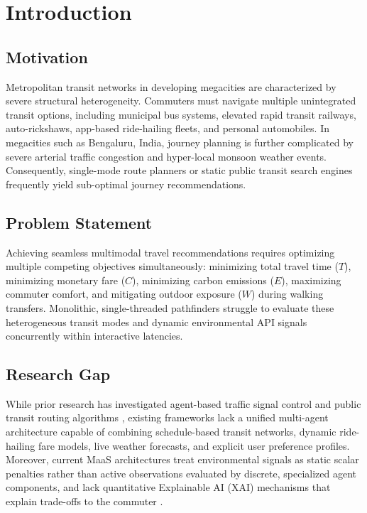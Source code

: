 \documentclass[runningheads]{llncs}
\begin{document}
\begin{abstract}
to $C=50$. Component ablation demonstrates that disabling multi-agent candidate coordination ($A_4$) causes a $39.2\%$ relative reduction in utility score ($82.3 \rightarrow 50.0$), indicating the importance of coordinated candidate aggregation in the evaluated scenario.

\end{abstract}


\section{Introduction}
\label{sec:intro}

\subsection{Motivation}
Metropolitan transit networks in developing megacities are characterized by severe structural heterogeneity. Commuters must navigate multiple unintegrated transit options, including municipal bus systems, elevated rapid transit railways, auto-rickshaws, app-based ride-hailing fleets, and personal automobiles. In megacities such as Bengaluru, India, journey planning is further complicated by severe arterial traffic congestion and hyper-local monsoon weather events. Consequently, single-mode route planners or static public transit search engines frequently yield sub-optimal journey recommendations.

\subsection{Problem Statement}
Achieving seamless multimodal travel recommendations requires optimizing multiple competing objectives simultaneously: minimizing total travel time ($T$), minimizing monetary fare ($C$), minimizing carbon emissions ($E$), maximizing commuter comfort, and mitigating outdoor exposure ($W$) during walking transfers. Monolithic, single-threaded pathfinders struggle to evaluate these heterogeneous transit modes and dynamic environmental API signals concurrently within interactive latencies.

\subsection{Research Gap}
While prior research has investigated agent-based traffic signal control \cite{chen2021multi} and public transit routing algorithms \cite{delling2015round, bast2016route}, existing frameworks lack a unified multi-agent architecture capable of combining schedule-based transit networks, dynamic ride-hailing fare models, live weather forecasts, and explicit user preference profiles. Moreover, current MaaS architectures treat environmental signals as static scalar penalties rather than active observations evaluated by discrete, specialized agent components, and lack quantitative Explainable AI (XAI) mechanisms that explain trade-offs to the commuter \cite{kumar2025explainable}.
\end{document}
